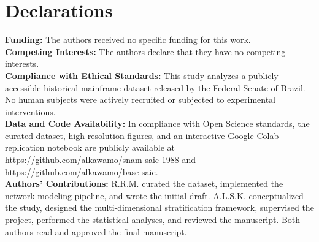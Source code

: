 \documentclass[pdflatex,sn-mathphys,iicol]{sn-jnl}
\begin{document}
\section*{Declarations}
\noindent\textbf{Funding:} The authors received no specific funding for this work.\\[3pt]
\noindent\textbf{Competing Interests:} The authors declare that they have no competing interests.\\[3pt]
\noindent\textbf{Compliance with Ethical Standards:} This study analyzes a publicly accessible historical mainframe dataset released by the Federal Senate of Brazil. No human subjects were actively recruited or subjected to experimental interventions.\\[3pt]
\noindent\textbf{Data and Code Availability:} In compliance with Open Science standards, the curated dataset, high-resolution figures, and an interactive Google Colab replication notebook are publicly available at \url{https://github.com/alkawamo/snam-saic-1988} and \url{https://github.com/alkawamo/base-saic}.\\[3pt]
\noindent\textbf{Authors' Contributions:} R.R.M. curated the dataset, implemented the network modeling pipeline, and wrote the initial draft. A.L.S.K. conceptualized the study, designed the multi-dimensional stratification framework, supervised the project, performed the statistical analyses, and reviewed the manuscript. Both authors read and approved the final manuscript.


\end{document}

